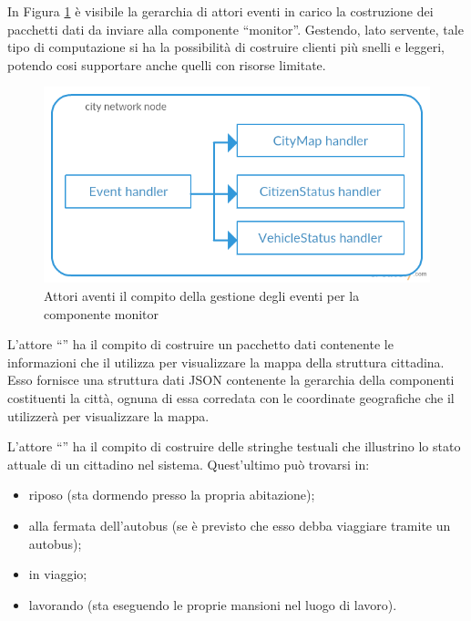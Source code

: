 In Figura \ref{soluzione-proposta-architettura-event-handler-gerarchia} è visibile la gerarchia di attori eventi in carico la costruzione dei pacchetti dati da inviare alla componente ``monitor''. Gestendo, lato servente, tale tipo di computazione si ha la possibilità di costruire clienti più snelli e leggeri, potendo cosi supportare anche quelli con risorse limitate.

\begin{figure}[h!]
\centering
\includegraphics[scale=0.5]{images/solution/event-handler.png}
\caption{Attori aventi il compito della gestione degli eventi per la componente monitor}
\label{soluzione-proposta-architettura-event-handler-gerarchia}
\end{figure}

L'attore ``'' ha il compito di costruire un pacchetto dati contenente le informazioni che il  utilizza per visualizzare la mappa della struttura cittadina. Esso fornisce una struttura dati JSON contenente la gerarchia della componenti costituenti la città, ognuna di essa corredata con le coordinate geografiche che il  utilizzerà per visualizzare la mappa.

L'attore ``'' ha il compito di costruire delle stringhe testuali che illustrino lo stato attuale di un cittadino nel sistema. Quest'ultimo può trovarsi in:

\begin{itemize}
\item{riposo (sta dormendo presso la propria abitazione);}
\item{alla fermata dell'autobus (se è previsto che esso debba viaggiare tramite un autobus);}
\item{in viaggio;}
\item{lavorando (sta eseguendo le proprie mansioni nel luogo di lavoro).}
\end{itemize}

